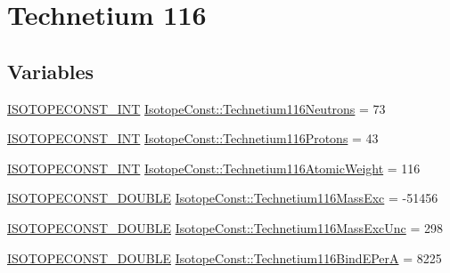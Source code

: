 \hypertarget{group___isotope_const-_technetium-_tc116}{}\section{Technetium 116}
\label{group___isotope_const-_technetium-_tc116}
\subsection*{Variables}
\begin{DoxyCompactItemize}
\item 
\mbox{\hyperlink{group___isotope_const-_macros_ga5f18360b3e99483a35c32d789e62621c}{I\+S\+O\+T\+O\+P\+E\+C\+O\+N\+S\+T\+\_\+\+I\+NT}} \mbox{\hyperlink{group___isotope_const-_technetium-_tc116_ga392c337f0e47e8e5d272cf43a693b3a5}{Isotope\+Const\+::\+Technetium116\+Neutrons}} = 73
\item 
\mbox{\hyperlink{group___isotope_const-_macros_ga5f18360b3e99483a35c32d789e62621c}{I\+S\+O\+T\+O\+P\+E\+C\+O\+N\+S\+T\+\_\+\+I\+NT}} \mbox{\hyperlink{group___isotope_const-_technetium-_tc116_ga14ad2ef13d5daf3d3ef7b8d5ab965291}{Isotope\+Const\+::\+Technetium116\+Protons}} = 43
\item 
\mbox{\hyperlink{group___isotope_const-_macros_ga5f18360b3e99483a35c32d789e62621c}{I\+S\+O\+T\+O\+P\+E\+C\+O\+N\+S\+T\+\_\+\+I\+NT}} \mbox{\hyperlink{group___isotope_const-_technetium-_tc116_gab299606dbb85ef7dcdd0034ecc2432c4}{Isotope\+Const\+::\+Technetium116\+Atomic\+Weight}} = 116
\item 
\mbox{\hyperlink{group___isotope_const-_macros_ga8f45a7272ce02c0b4c65c44636ed719a}{I\+S\+O\+T\+O\+P\+E\+C\+O\+N\+S\+T\+\_\+\+D\+O\+U\+B\+LE}} \mbox{\hyperlink{group___isotope_const-_technetium-_tc116_ga603671ff72dc35cb6478b32086bc1f44}{Isotope\+Const\+::\+Technetium116\+Mass\+Exc}} = -\/51456
\item 
\mbox{\hyperlink{group___isotope_const-_macros_ga8f45a7272ce02c0b4c65c44636ed719a}{I\+S\+O\+T\+O\+P\+E\+C\+O\+N\+S\+T\+\_\+\+D\+O\+U\+B\+LE}} \mbox{\hyperlink{group___isotope_const-_technetium-_tc116_gad7ab925ecb360bebc59c870f3219bb1b}{Isotope\+Const\+::\+Technetium116\+Mass\+Exc\+Unc}} = 298
\item 
\mbox{\hyperlink{group___isotope_const-_macros_ga8f45a7272ce02c0b4c65c44636ed719a}{I\+S\+O\+T\+O\+P\+E\+C\+O\+N\+S\+T\+\_\+\+D\+O\+U\+B\+LE}} \mbox{\hyperlink{group___isotope_const-_technetium-_tc116_gad8748cf647730dc9e5c4ca5db1c11e0f}{Isotope\+Const\+::\+Technetium116\+Bind\+E\+PerA}} = 8225
\item 

\end{DoxyCompactItemize}
